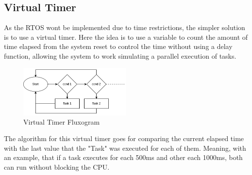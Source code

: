 \subsection{Virtual Timer}
As the RTOS wont be implemented due to time restrictions, the simpler solution is to use a virtual timer.
Here the idea is to use a variable to count the amount of time elapsed from the system reset to control
the time without using a delay function, allowing the system to work simulating a parallel execution of tasks.

\begin{figure}[H]
    \centering
    \includegraphics[width=0.5\textwidth]{images/chapter/implementation/Virtual timer.png}  %
    \caption{Virtual Timer Fluxogram}
    \label{fig:Virtual Timer Fluxogram}        
\end{figure}


The algorithm for this virtual timer goes for comparing the current elapsed time with the last value that the
"Task" was executed for each of them. Meaning, with an example, that if a task executes for each 500ms and other each 1000ms, both
can run without blocking the CPU.
